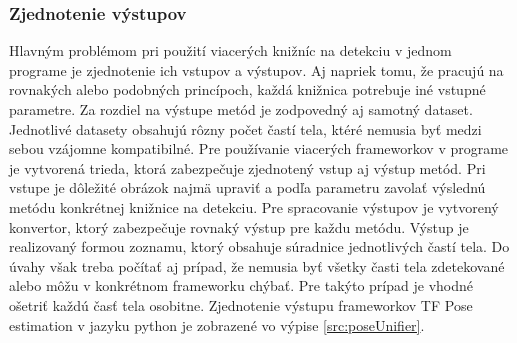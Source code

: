 \documentclass[slovak,master,dept460,male,cpp,cpdeclaration]{diploma}
\begin{document}
\subsubsection*{Zjednotenie výstupov}
	\label{sec:intersect}
Hlavným problémom pri použití viacerých knižníc na detekciu v jednom programe  je zjednotenie  ich vstupov a výstupov. Aj napriek tomu, že pracujú na rovnakých alebo podobných princípoch, každá knižnica potrebuje iné vstupné parametre. Za rozdiel na výstupe metód je zodpovedný aj samotný dataset. Jednotlivé datasety obsahujú rôzny počet častí tela, ktéré nemusia  byť medzi sebou vzájomne kompatibilné. Pre  používanie viacerých frameworkov v programe je vytvorená  trieda, ktorá  zabezpečuje zjednotený vstup aj výstup metód. Pri vstupe je dôležité obrázok najmä upraviť a podľa parametru zavolať výslednú metódu  konkrétnej knižnice na detekciu. Pre spracovanie  výstupov je  vytvorený konvertor, ktorý zabezpečuje  rovnaký výstup pre každu metódu. Výstup je realizovaný formou zoznamu, ktorý obsahuje súradnice  jednotlivých častí tela.  Do úvahy však treba počítať aj prípad, že nemusia byť všetky časti tela zdetekované alebo môžu v konkrétnom frameworku chýbať. Pre takýto prípad je vhodné ošetriť každú časť  tela osobitne. Zjednotenie výstupu frameworkov TF Pose estimation v jazyku python je zobrazené vo výpise \ref{src:poseUnifier}.


\newpage

\end{document}

